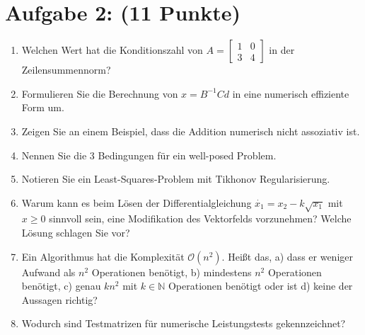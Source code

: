\documentclass[12pt]{article}
\begin{document}
\section*{Aufgabe 2: (11 Punkte)}
\begin{enumerate}
	\item Welchen Wert hat die Konditionszahl von $A=\begin{bmatrix}
	1 & 0 \\ 3 & 4
	 \end{bmatrix}$ in der Zeilensummennorm?
	
	
	\vspace{1.5cm}
	
	\item Formulieren Sie die Berechnung von $x = B^{-1}Cd$ in eine numerisch effiziente Form um.
	
	\vspace{1.5cm}
	
	\item Zeigen Sie an einem Beispiel, dass die Addition numerisch nicht assoziativ ist.
	
	\vspace{1.5cm}
	
	\item Nennen Sie die 3 Bedingungen für ein well-posed Problem.
	
	\vspace{1.5cm}
	
	\item Notieren Sie ein Least-Squares-Problem mit Tikhonov Regularisierung.
	
	\vspace{1.5cm}
	
	\item Warum kann es beim Lösen der Differentialgleichung $\dot{x_1} = x_2 - k \sqrt{x_1}$ mit \mbox{$x\geq 0$} sinnvoll sein, eine Modifikation des Vektorfelds vorzunehmen? Welche Lösung schlagen Sie vor?
	
	\vspace{1cm}
	
	\item Ein Algorithmus hat die Komplexität $\mathcal{O}(n^2)$. Heißt das, a) dass er weniger Aufwand als $n^2$ Operationen benötigt, b) mindestens $n^2$ Operationen benötigt, c) genau $kn^2$ mit $k\in \mathbb{N}$ Operationen benötigt oder ist d) keine der Aussagen richtig?
	
	\vspace{1cm}
	

	\item Wodurch sind Testmatrizen für numerische Leistungstests gekennzeichnet?
	


\end{enumerate}
\end{document}

